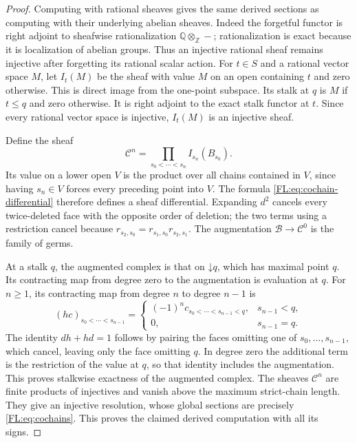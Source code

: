 \documentclass[11pt,a4paper]{article}
\theoremstyle{definition}\newtheorem{definition}[theorem]{Definition}
\providecommand{\RQ}{\mathbb Q}
\begin{document}
\begin{proof}
Computing with rational sheaves gives the same derived sections as
computing with their underlying abelian sheaves. Indeed the forgetful
functor is right adjoint to sheafwise rationalization
$\RQ\otimes_{\mathbb Z}-$; rationalization is exact because it is
localization of abelian groups. Thus an injective rational sheaf
remains injective after forgetting its rational scalar action.
For $t\in S$ and a rational vector space $M$, let $I_t(M)$ be the
sheaf with value $M$ on an open containing $t$ and zero otherwise.
This is direct image from the one-point subspace. Its stalk at $q$
is $M$ if $t\le q$ and zero otherwise. It is right adjoint to the
exact stalk functor at $t$. Since every rational vector space is
injective, $I_t(M)$ is an injective sheaf.

Define the sheaf
\[
 \mathcal C^n=\prod_{s_0<\cdots<s_n}I_{s_n}(B_{s_0}).
\]
Its value on a lower open $V$ is the product over all chains contained
in $V$, since having $s_n\in V$ forces every preceding point into
$V$. The formula \eqref{FL:eq:cochain-differential} therefore defines a
sheaf differential. Expanding $d^2$ cancels every twice-deleted face
with the opposite order of deletion; the two terms using a restriction
cancel because $r_{s_2,s_0}=r_{s_1,s_0}r_{s_2,s_1}$.
The augmentation $\mathcal B\to\mathcal C^0$ is the family of germs.

At a stalk $q$, the augmented complex is that on
$\mathord\downarrow q$, which has maximal point $q$.
Its contracting map from degree zero to the augmentation is evaluation
at $q$. For $n\ge1$, its contracting map from degree $n$ to degree
$n-1$ is
\[
 (hc)_{s_0<\cdots<s_{n-1}}=
 \begin{cases}
 (-1)^n c_{s_0<\cdots<s_{n-1}<q},&s_{n-1}<q,\\
 0,&s_{n-1}=q.
 \end{cases}
\]
The identity $dh+hd=1$ follows by pairing the faces omitting one of
$s_0,\ldots,s_{n-1}$, which cancel, leaving only the face omitting
$q$. In degree zero the additional term is the restriction of the
value at $q$, so that identity includes the augmentation. This proves
stalkwise exactness of the augmented complex. The sheaves
$\mathcal C^n$ are finite products of injectives and vanish above the
maximum strict-chain length. They give an injective resolution, whose
global sections are precisely \eqref{FL:eq:cochains}. This proves the
claimed derived computation with all its signs.
\end{proof}
\end{document}
